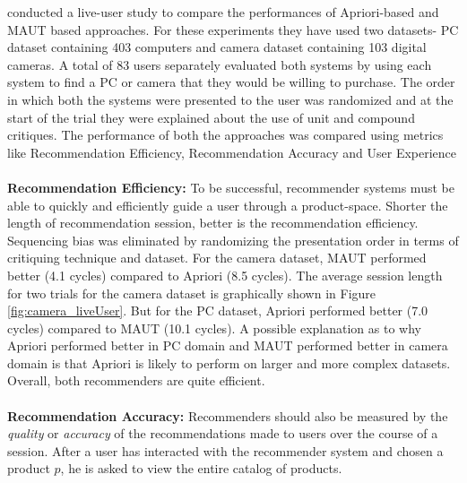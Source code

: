 \cite{liveUserStudy} conducted a live-user study to compare the performances of Apriori-based and MAUT based approaches.
For these experiments they have used two datasets- PC dataset containing 403 computers and camera dataset containing 103 digital cameras.
A total of 83 users separately evaluated both systems by using each system to find a PC or camera that they would be willing to purchase.
The order in which both the systems were presented to the user was randomized and at the start of the trial they were explained about the use of unit and compound critiques.
The performance of both the approaches was compared using metrics like Recommendation Efficiency, Recommendation Accuracy and User Experience\\
\\
\textbf{Recommendation Efficiency:} To be successful, recommender systems must be able to quickly and efficiently guide a user through a product-space. 
Shorter the length of recommendation session, better is the recommendation efficiency.
Sequencing bias was eliminated by randomizing the presentation order in terms of critiquing technique and dataset.
For the camera dataset, MAUT performed better (4.1 cycles) compared to Apriori (8.5 cycles).
The average session length for two trials for the camera dataset is graphically shown in Figure \ref{fig:camera_liveUser}.
But for the PC dataset, Apriori performed better (7.0 cycles) compared to MAUT (10.1 cycles).
A possible explanation as to why Apriori performed better in PC domain and MAUT performed better in camera domain is that Apriori is likely to perform on larger and more complex datasets.
Overall, both recommenders are quite efficient.\\
\\
\textbf{Recommendation Accuracy:} 
Recommenders should also be measured by the \textit{quality} or \textit{accuracy} of the recommendations made to users over the course of a session. 
After a user has interacted with the recommender system and chosen a product $p$, he is asked to view the entire catalog of products. 
